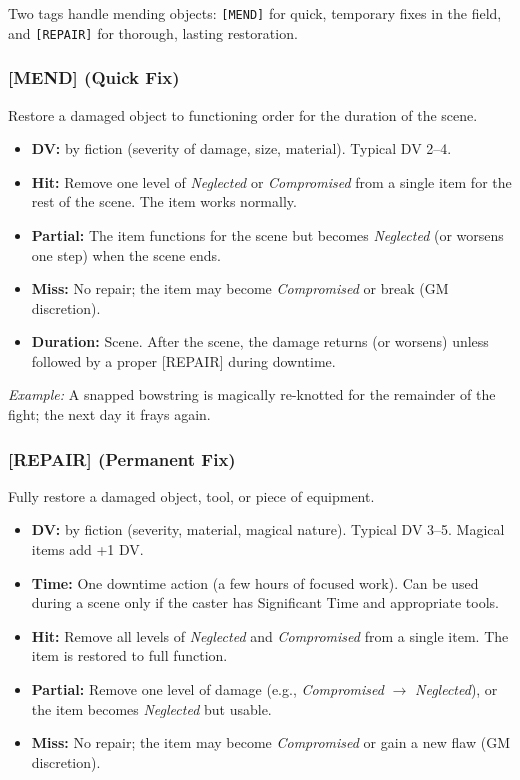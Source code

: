 Two tags handle mending objects: \texttt{[MEND]} for quick, temporary fixes in the field, and \texttt{[REPAIR]} for thorough, lasting restoration.

\subsubsection{[MEND] (Quick Fix)}
Restore a damaged object to functioning order for the duration of the scene.

\begin{itemize}
  \item \textbf{DV:} by fiction (severity of damage, size, material). Typical DV 2--4.
  \item \textbf{Hit:} Remove one level of \textit{Neglected} or \textit{Compromised} from a single item for the rest of the scene. The item works normally.
  \item \textbf{Partial:} The item functions for the scene but becomes \textit{Neglected} (or worsens one step) when the scene ends.
  \item \textbf{Miss:} No repair; the item may become \textit{Compromised} or break (GM discretion).
  \item \textbf{Duration:} Scene. After the scene, the damage returns (or worsens) unless followed by a proper [REPAIR] during downtime.
\end{itemize}

\textit{Example:} A snapped bowstring is magically re-knotted for the remainder of the fight; the next day it frays again.

\subsubsection{[REPAIR] (Permanent Fix)}
Fully restore a damaged object, tool, or piece of equipment.

\begin{itemize}
  \item \textbf{DV:} by fiction (severity, material, magical nature). Typical DV 3--5. Magical items add +1 DV.
  \item \textbf{Time:} One downtime action (a few hours of focused work). Can be used during a scene only if the caster has Significant Time and appropriate tools.
  \item \textbf{Hit:} Remove all levels of \textit{Neglected} and \textit{Compromised} from a single item. The item is restored to full function.
  \item \textbf{Partial:} Remove one level of damage (e.g., \textit{Compromised} $\rightarrow$ \textit{Neglected}), or the item becomes \textit{Neglected} but usable.
  \item \textbf{Miss:} No repair; the item may become \textit{Compromised} or gain a new flaw (GM discretion).
\end{itemize}

